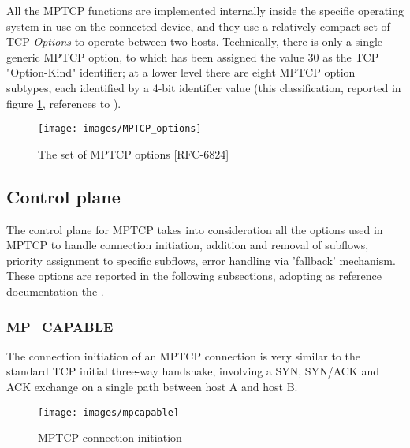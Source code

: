 All the MPTCP functions are implemented internally inside the specific operating system in use on the connected device, and they use a relatively compact set of TCP \textit{Options} to operate between two hosts. Technically, there is only a single generic MPTCP option, to which has been assigned the value 30 as the TCP "Option-Kind" identifier; at a lower level there are eight MPTCP option subtypes, each identified by a 4-bit identifier value (this classification, reported in figure \ref{fig:MPTCP_options}, references to ). 

\begin{figure}[!htb]
\centering
\texttt{[image: images/MPTCP\_options]}
\caption{The set of MPTCP options [RFC-6824]}
\label{fig:MPTCP_options}
\end{figure}

\subsection{Control plane}
The control plane for MPTCP takes into consideration all the options used in MPTCP to handle connection initiation, addition and removal of subflows, priority assignment to specific subflows, error handling via 'fallback' mechanism. These options are reported in the following subsections, adopting as reference documentation the .

\subsubsection{MP\_CAPABLE}
The connection initiation of an MPTCP connection is very similar to the standard TCP initial three-way handshake, involving a SYN, SYN/ACK and ACK exchange on a single path between host A and host B. 

\begin{figure}[!htb]
\centering
\texttt{[image: images/mpcapable]}
\caption{MPTCP connection initiation}
\label{fig:mpcapable}
\end{figure}

